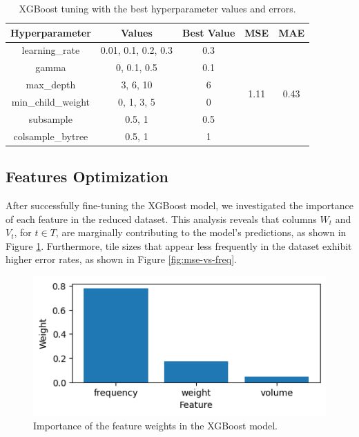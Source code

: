 \documentclass[runningheads]{llncs}
\begin{document}
\begin{table}
\small
\centering
\caption{XGBoost tuning with the best hyperparameter values and errors.}\label{tab:grid-search-deep-param}
\begin{tabular}{|c|c|c|c|c|}
\hline
Hyperparameter     & Values              & Best Value & MSE                   & MAE                   \\ \hline \hline
learning\_rate     & 0.01, 0.1, 0.2, 0.3 & 0.3        & \multirow{6}{*}{1.11} & \multirow{6}{*}{0.43} \\
gamma              & 0, 0.1, 0.5         & 0.1        &                       &                       \\
max\_depth         & 3, 6, 10            & 6          &                       &                       \\
min\_child\_weight & 0, 1, 3, 5          & 0          &                       &                       \\
subsample          & 0.5, 1              & 0.5        &                       &                       \\
colsample\_bytree  & 0.5, 1              & 1          &                       &                       \\ \hline
\end{tabular}
\end{table}


\subsection{Features Optimization \label{featureoptimization}} 

After successfully fine-tuning the XGBoost model, we investigated the importance of each feature in the reduced dataset. This analysis reveals that columns $W_{t}$ and $V_{t}$, for $t \in T$, are marginally contributing to the model's predictions, as shown in Figure \ref{fig:feat-weights-1}. Furthermore, tile sizes that appear less frequently in the dataset exhibit higher error rates, as shown in Figure \ref{fig:mse-vs-freq}. 

\begin{figure}
\centering
\includegraphics[width=.55\textwidth]{figures/feat-weights-1.png}
\caption{Importance of the feature weights in the XGBoost model.} \label{fig:feat-weights-1}
\end{figure}
\end{document}
